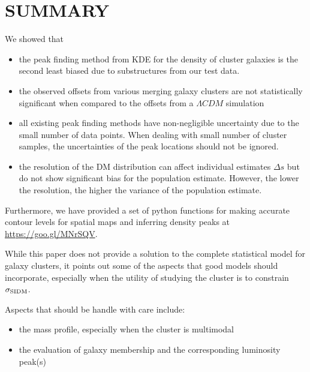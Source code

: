 \section{SUMMARY}
We showed that 
\begin{itemize}
		\item  the peak finding method from KDE for the density of cluster
			galaxies is the second least biased due to substructures from our test data. 
		\item the observed offsets from various merging galaxy clusters 
			are not statistically significant when compared to the offsets from a  
			$\Lambda CDM$ simulation	

		\item  all existing peak finding methods have non-negligible uncertainty 
			due to the small number of data points. When dealing with small number of
			cluster samples, the uncertainties of the peak locations should not be
			ignored.
		\item the resolution of the DM distribution can affect
			individual estimates $\Delta s$ but do not show significant bias for
			the population estimate. However, the lower the resolution, the higher
			the variance of the population estimate.  
\end{itemize}

Furthermore, we have provided a set of python functions for making accurate 
contour levels for spatial maps and inferring density peaks at 
\href{https://goo.gl/MNrSQV}{https://goo.gl/MNrSQV}.



While this paper does not provide a solution to the complete statistical model
for galaxy clusters, it points out some of the aspects that good models should
incorporate, especially when the utility of studying the cluster is to
constrain $\sigma_{\rm SIDM}$.

Aspects that should be handle with care include:
\begin{itemize}
		\item the mass profile, especially when the cluster is multimodal 
		\item the evaluation of galaxy membership and the corresponding luminosity
			peak(s)
\end{itemize}



